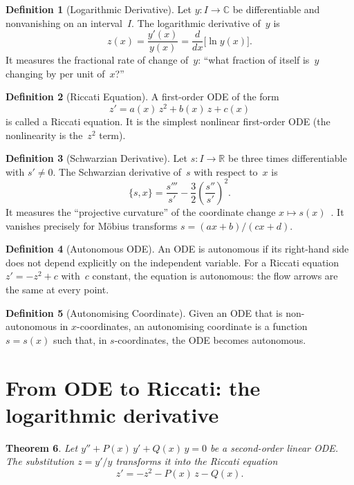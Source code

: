 \documentclass{amsart}
\newtheorem{theorem}{Theorem}[section]
\theoremstyle{definition}
\newtheorem{definition}[theorem]{Definition}
\theoremstyle{remark}
\begin{document}
\begin{definition}[Logarithmic Derivative]
Let $y\colon I \to \mathbb{C}$ be differentiable and nonvanishing on an interval~$I$. The logarithmic derivative of~$y$ is
\[
z(x) = \frac{y'(x)}{y(x)} = \frac{d}{dx}\bigl[\ln y(x)\bigr].
\]
It measures the fractional rate of change of~$y$: ``what fraction of itself is~$y$ changing by per unit of~$x$?''
\end{definition}

\begin{definition}[Riccati Equation]
A first-order ODE of the form
\[
z' = a(x)\,z^2 + b(x)\,z + c(x)
\]
is called a Riccati equation. It is the simplest nonlinear first-order ODE (the nonlinearity is the~$z^2$ term).
\end{definition}

\begin{definition}[Schwarzian Derivative]
Let $s\colon I \to \mathbb{R}$ be three times differentiable with $s' \neq 0$. The Schwarzian derivative of~$s$ with respect to~$x$ is
\[
\{s, x\} = \frac{s'''}{s'} - \frac{3}{2}\left(\frac{s''}{s'}\right)^{\!2}.
\]
It measures the ``projective curvature'' of the coordinate change $x \mapsto s(x)$~\cite{Cayley1880, Osgood1998}. It vanishes precisely for M\"obius transforms $s = (ax+b)/(cx+d)$.
\end{definition}

\begin{definition}[Autonomous ODE]
An ODE is autonomous if its right-hand side does not depend explicitly on the independent variable. For a Riccati equation $z' = -z^2 + c$ with~$c$ constant, the equation is autonomous: the flow arrows are the same at every point.
\end{definition}

\begin{definition}[Autonomising Coordinate]
Given an ODE that is non-autonomous in $x$-coordinates, an autonomising coordinate is a function $s = s(x)$ such that, in $s$-coordinates, the ODE becomes autonomous.
\end{definition}

\section{From ODE to Riccati: the logarithmic derivative}

\begin{theorem}\label{thm:ode-to-riccati}
Let $y'' + P(x)\,y' + Q(x)\,y = 0$ be a second-order linear ODE. The substitution $z = y'/y$ transforms it into the Riccati equation
\[
z' = -z^2 - P(x)\,z - Q(x).
\]
\end{theorem}
\end{document}
